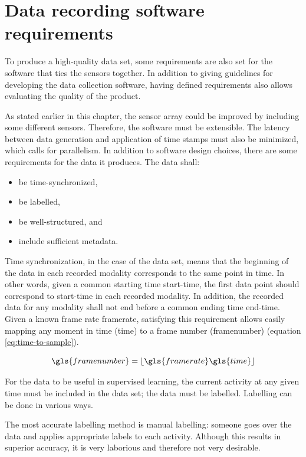 \section{Data recording software requirements}
\label{sec:2-requirements}

To produce a high-quality data set,
some requirements are also set for the software that ties the sensors together.
In addition to giving guidelines for developing the data collection software,
having defined requirements also allows evaluating the quality of the product.

As stated earlier in this chapter,
the sensor array could be improved by including some different sensors.
Therefore, the software must be extensible.
The latency between data generation and application of time stamps must also be minimized,
which calls for parallelism.
In addition to software design choices, there are some requirements for the data it produces.
The data shall:
\begin{itemize}
    \item be time-synchronized,
    \item be labelled,
    \item be well-structured, and
    \item include sufficient metadata.
\end{itemize}

Time synchronization, in the case of the data set,
means that the beginning of the data in each recorded modality
corresponds to the same point in time.
In other words, given a common starting time \gls{start-time},
the first data point should correspond to \gls{start-time} in each recorded modality.
In addition, the recorded data for any modality shall not end before a common ending time \gls{end-time}.
Given a known frame rate \gls{framerate},
satisfying this requirement allows easily mapping any moment in time (\gls{time}) to a frame number (\gls{framenumber}) (equation \ref{eq:time-to-sample}).

\begin{equation}
    \label{eq:time-to-sample}
    \gls{framenumber} = \lfloor \gls{framerate} \gls{time} \rfloor
\end{equation}

For the data to be useful in supervised learning,
the current activity at any given time must be included in the data set;
the data must be labelled.
Labelling can be done in various ways.

The most accurate labelling method is manual labelling:
someone goes over the data and applies appropriate labels to each activity.
Although this results in superior accuracy,
it is very laborious and therefore not very desirable.

